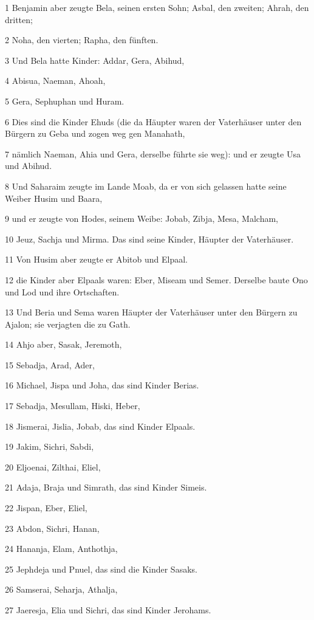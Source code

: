 \par 1 Benjamin aber zeugte Bela, seinen ersten Sohn; Asbal, den zweiten; Ahrah, den dritten;
\par 2 Noha, den vierten; Rapha, den fünften.
\par 3 Und Bela hatte Kinder: Addar, Gera, Abihud,
\par 4 Abisua, Naeman, Ahoah,
\par 5 Gera, Sephuphan und Huram.
\par 6 Dies sind die Kinder Ehuds (die da Häupter waren der Vaterhäuser unter den Bürgern zu Geba und zogen weg gen Manahath,
\par 7 nämlich Naeman, Ahia und Gera, derselbe führte sie weg): und er zeugte Usa und Abihud.
\par 8 Und Saharaim zeugte im Lande Moab, da er von sich gelassen hatte seine Weiber Husim und Baara,
\par 9 und er zeugte von Hodes, seinem Weibe: Jobab, Zibja, Mesa, Malcham,
\par 10 Jeuz, Sachja und Mirma. Das sind seine Kinder, Häupter der Vaterhäuser.
\par 11 Von Husim aber zeugte er Abitob und Elpaal.
\par 12 die Kinder aber Elpaals waren: Eber, Miseam und Semer. Derselbe baute Ono und Lod und ihre Ortschaften.
\par 13 Und Beria und Sema waren Häupter der Vaterhäuser unter den Bürgern zu Ajalon; sie verjagten die zu Gath.
\par 14 Ahjo aber, Sasak, Jeremoth,
\par 15 Sebadja, Arad, Ader,
\par 16 Michael, Jispa und Joha, das sind Kinder Berias.
\par 17 Sebadja, Mesullam, Hiski, Heber,
\par 18 Jismerai, Jislia, Jobab, das sind Kinder Elpaals.
\par 19 Jakim, Sichri, Sabdi,
\par 20 Eljoenai, Zilthai, Eliel,
\par 21 Adaja, Braja und Simrath, das sind Kinder Simeis.
\par 22 Jispan, Eber, Eliel,
\par 23 Abdon, Sichri, Hanan,
\par 24 Hananja, Elam, Anthothja,
\par 25 Jephdeja und Pnuel, das sind die Kinder Sasaks.
\par 26 Samserai, Seharja, Athalja,
\par 27 Jaeresja, Elia und Sichri, das sind Kinder Jerohams.
